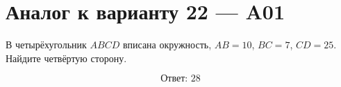 


\section*{Аналог к варианту 22 — A01}
В четырёхугольник \(ABCD\) вписана окружность, \(AB=10\), \(BC=7\), \(CD=25\). Найдите четвёртую сторону.
\begin{center}\end{center}
\[\boxed{\text{Ответ: }28}\]

